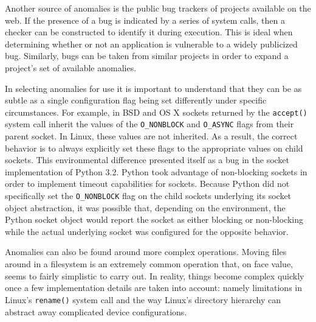 
Another source of anomalies is the public bug trackers of projects
available on the web.  If the presence of a bug is indicated by a series of
system calls, then a checker can be constructed to identify it during
execution. This is ideal when determining whether or not an application is
vulnerable to a widely publicized bug.  Similarly, bugs can be taken from
similar projects in order to expand a project's set of available anomalies.

In selecting anomalies for use it is important to understand that they can
be as subtle as a single configuration flag being set differently under
specific circumstances.  For example, in BSD and OS X sockets returned by
the {\tt accept()} system call inherit the values of the {\tt O\_NONBLOCK}
and {\tt O\_ASYNC} flags from their parent socket.  In Linux, these values
are not inherited.  As a result, the correct behavior is to always
explicitly set these flags to the appropriate values on child sockets.
This environmental difference presented itself as a bug in the socket
implementation of Python 3.2.  Python took advantage of non-blocking
sockets in order to implement timeout capabilities for sockets.  Because
Python did not specifically set the {\tt O\_NONBLOCK} flag on the child
sockets underlying its socket object abstraction, it was possible that,
depending on the environment, the Python socket object would report the
socket as either blocking or non-blocking while the actual underlying
socket was configured for the opposite behavior.

Anomalies can also be found around more complex operations.  Moving files
around in a filesystem is an extremely common operation that, on face
value, seems to fairly simplistic to carry out.  In reality, things become
complex quickly once a few implementation details are taken into account:
namely limitations in Linux's {\tt rename()} system call and the way
Linux's directory hierarchy can abstract away complicated device
configurations.

